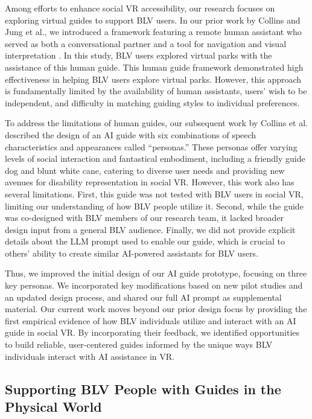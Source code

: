 Among efforts to enhance social VR accessibility, our research focuses on exploring virtual guides to support BLV users. In our prior work by Collins and Jung et al., we introduced a framework featuring a remote human assistant who served as both a conversational partner and a tool for navigation and visual interpretation \cite{collins2023guide}. In this study, BLV users explored virtual parks with the assistance of this human guide. This human guide framework demonstrated high effectiveness in helping BLV users explore virtual parks. However, this approach is fundamentally limited by the availability of human assistants, users’ wish to be independent, and difficulty in matching guiding styles to individual preferences.

To address the limitations of human guides, our subsequent work by Collins et al. described the design of an AI guide with six combinations of speech characteristics and appearances called “personas.” \cite{collins2024ai} These personas offer varying levels of social interaction and fantastical embodiment, including a friendly guide dog and blunt white cane, catering to diverse user needs and providing new avenues for disability representation in social VR. However, this work also has several limitations. First, this guide was not tested with BLV users in social VR, limiting our understanding of how BLV people utilize it. Second, while the guide was co-designed with BLV members of our research team, it lacked broader design input from a general BLV audience. Finally, we did not provide explicit details about the LLM prompt used to enable our guide, which is crucial to others’ ability to create similar AI-powered assistants for BLV users.

Thus, we improved the initial design of our AI guide prototype, focusing on three key personas. We incorporated key modifications based on new pilot studies and an updated design process, and shared our full AI prompt as supplemental material. Our current work moves beyond our prior design focus by providing the first empirical evidence of how BLV individuals utilize and interact with an AI guide in social VR. By incorporating their feedback, we identified opportunities to build reliable, user-centered guides informed by the unique ways BLV individuals interact with AI assistance in VR.

\subsection{Supporting BLV People with Guides in the Physical World}

